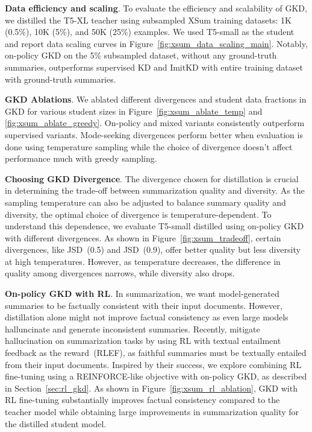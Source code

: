 \documentclass{article} %
\begin{document}
\textbf{Data efficiency and scaling}. 
To evaluate the efficiency and scalability of GKD, we distilled the T5-XL teacher using subsampled XSum training datasets: 1K (0.5\%), 10K (5\%), and 50K (25\%) examples.
We used T5-small as the student and report data scaling curves in Figure~\ref{fig:xsum_data_scaling_main}. Notably, on-policy GKD on the 5\% subsampled dataset, without any ground-truth summaries, outperforms supervised KD and ImitKD with entire training dataset with ground-truth summaries.

\textbf{GKD Ablations}. We ablated different divergences and student data fractions in GKD for various student sizes in Figure~\ref{fig:xsum_ablate_temp} and \ref{fig:xsum_ablate_greedy}. On-policy and mixed variants consistently outperform supervised variants. Mode-seeking divergences perform better when evaluation is done using temperature sampling while the choice of divergence doesn't affect performance much with greedy sampling. 





\textbf{Choosing GKD Divergence}. The divergence chosen for distillation is crucial in determining the trade-off between summarization quality and diversity. As the sampling temperature can also be adjusted to balance summary quality and diversity, the optimal choice of divergence is temperature-dependent. To understand this dependence, we evaluate T5-small distilled using on-policy GKD with different divergences. As shown in Figure~\ref{fig:xsum_tradeoff}, certain divergences, like JSD~(0.5) and JSD~(0.9), offer better quality but less diversity at high temperatures. However, as temperature decreases, the difference in quality among divergences narrows, while diversity also drops.


\textbf{On-policy GKD with RL}. In summarization, we want model-generated summaries to be factually consistent with their input documents. However, distillation alone might not improve factual consistency as even large models halluncinate and generate inconsistent summaries. Recently, \citet{roit2023factually} mitigate hallucination on summarization tasks by using RL with textual entailment feedback as the reward~(RLEF), as faithful summaries must be textually entailed from their input documents. Inspired by their success, we explore combining RL fine-tuning using a REINFORCE-like objective with on-policy GKD, as described in Section~\ref{sec:rl_gkd}. As shown in Figure~\ref{fig:xsum_rl_ablation}, GKD with RL fine-tuning substantially improves factual consistency compared to the teacher model while obtaining large improvements in summarization quality for the distilled student model. 
\end{document}
